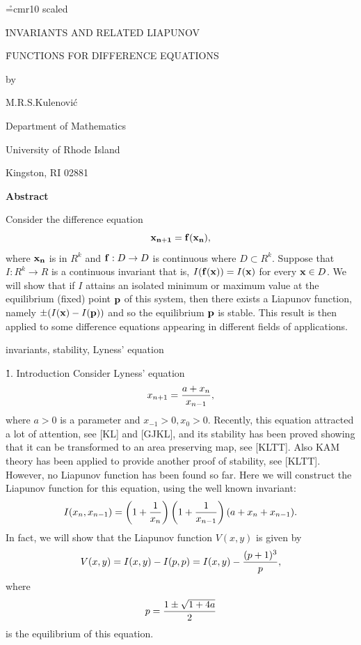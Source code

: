 
\vsize 18cm
\hsize 15.4cm
\item{}
\vskip 1cm
\font\r=cmr10 scaled

\centerline{\r INVARIANTS AND RELATED LIAPUNOV}
\medskip
\centerline{\r FUNCTIONS FOR DIFFERENCE EQUATIONS}
\bigskip
\centerline{by}
\bigskip
\centerline{M.R.S.Kulenovi\'c}

\centerline{Department of Mathematics}

\centerline{University of Rhode Island}

\centerline{Kingston, RI 02881}

\vskip 1.5cm
\centerline{\bf Abstract}
\vskip 1.5cm
Consider the difference equation
$${\bf x_{n+1}}={\bf f( x_n)},$$
where ${\bf x_n}$ is in $R^k$ and ${\bf f}: D\to D$ is continuous where $D \subset R^k$.
Suppose that $I:R^k\to R$ is a continuous invariant that is, $I({\bf f(x)})=I({\bf x})$
for every ${\bf x}\in D$. We will show that if $I$ attains an isolated minimum
or maximum value
at the  equilibrium (fixed) point ${\bf p}$  of this system, then there exists a
Liapunov function, namely  $\pm(I({\bf x}) - I({\bf p}))$ and so the equilibrium
${\bf p}$ is stable. This result is then applied to some difference equations
appearing in different fields of applications.

\vskip 4.5cm

 invariants, stability, Lyness' equation



\vfill\eject
\vglue 2cm

{\r 1. Introduction}
\bigskip
Consider Lyness' equation
$$x_{n+1}={{a + x_n}\over x_{n-1}},$$
where $a>0$ is a parameter and $x_{-1}>0, x_0>0$. Recently, this equation
attracted a lot of attention, see [KL] and [GJKL], and its stability has been
proved showing that it
can be transformed to an area preserving map, see [KLTT]. Also KAM theory has
been applied
to provide another proof of stability, see [KLTT]. However, no Liapunov function
has been found so far. Here we will construct the Liapunov function for this
equation, using the well known invariant:
$$I(x_n,x_{n-1})=\left(1+{1\over x_n}\right)\left(1+{1\over x_{n-1}}\right)(a+x_n+x_{n-1}).$$
In fact, we will show that the Liapunov function $V(x,y)$ is given by
$$V(x,y)=I(x,y)-I(p,p)=I(x,y)-{(p+1)^3\over p},$$
where
$$p= {{1\pm \sqrt{1+4a}}\over 2}$$
is the equilibrium of this equation.

